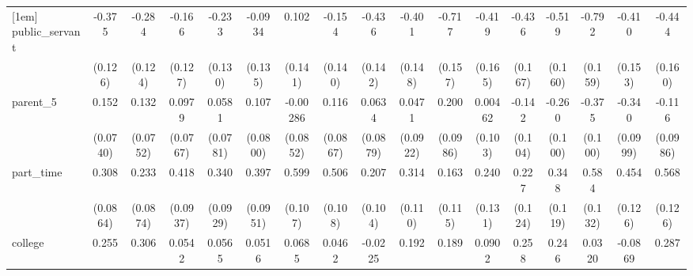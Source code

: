 {\begin{tabular}{l*{16}{c}}
[1em]
public\_servant      &      -0.375\sym{**} &      -0.284\sym{*}  &      -0.166         &      -0.233         &     -0.0934         &       0.102         &      -0.154         &      -0.436\sym{**} &      -0.401\sym{**} &      -0.717\sym{***}&      -0.419\sym{*}  &      -0.436\sym{**} &      -0.519\sym{**} &      -0.792\sym{***}&      -0.410\sym{**} &      -0.444\sym{**} \\
                    &     (0.126)         &     (0.124)         &     (0.127)         &     (0.130)         &     (0.135)         &     (0.141)         &     (0.140)         &     (0.142)         &     (0.148)         &     (0.157)         &     (0.165)         &     (0.167)         &     (0.160)         &     (0.159)         &     (0.153)         &     (0.160)         \\
[1em]
parent\_5            &       0.152\sym{*}  &       0.132         &      0.0979         &      0.0581         &       0.107         &    -0.00286         &       0.116         &      0.0634         &      0.0471         &       0.200\sym{*}  &     0.00462         &      -0.142         &      -0.260\sym{**} &      -0.375\sym{***}&      -0.340\sym{***}&      -0.116         \\
                    &    (0.0740)         &    (0.0752)         &    (0.0767)         &    (0.0781)         &    (0.0800)         &    (0.0852)         &    (0.0867)         &    (0.0879)         &    (0.0922)         &    (0.0986)         &     (0.103)         &     (0.104)         &     (0.100)         &     (0.100)         &    (0.0999)         &    (0.0986)         \\
[1em]
part\_time           &       0.308\sym{***}&       0.233\sym{**} &       0.418\sym{***}&       0.340\sym{***}&       0.397\sym{***}&       0.599\sym{***}&       0.506\sym{***}&       0.207\sym{*}  &       0.314\sym{**} &       0.163         &       0.240         &       0.227         &       0.348\sym{**} &       0.584\sym{***}&       0.454\sym{***}&       0.568\sym{***}\\
                    &    (0.0864)         &    (0.0874)         &    (0.0937)         &    (0.0929)         &    (0.0951)         &     (0.107)         &     (0.108)         &     (0.104)         &     (0.110)         &     (0.115)         &     (0.131)         &     (0.124)         &     (0.119)         &     (0.132)         &     (0.126)         &     (0.126)         \\
[1em]
college             &       0.255\sym{**} &       0.306\sym{**} &      0.0542         &      0.0565         &      0.0516         &      0.0685         &      0.0462         &     -0.0225         &       0.192         &       0.189         &      0.0902         &       0.258\sym{*}  &       0.246         &      0.0320         &     -0.0869         &       0.287\sym{*}  \\

\end{tabular}}
